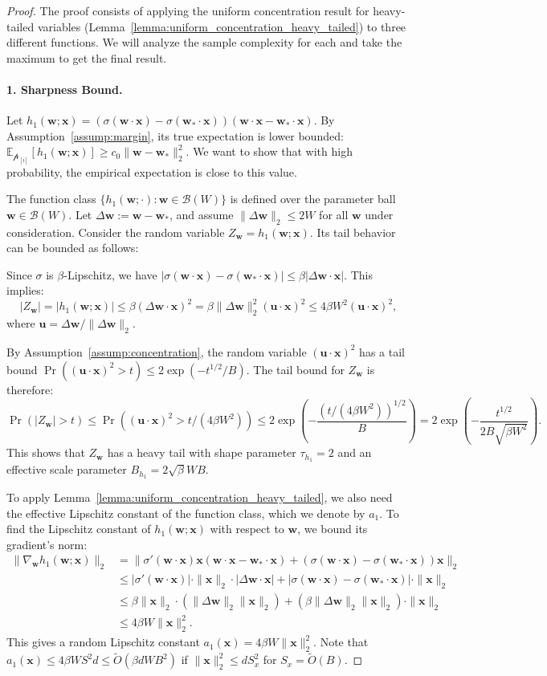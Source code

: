 \documentclass[11pt]{article}
\numberwithin{thm}{section}
\theoremstyle{plain}
\theoremstyle{definition}
\theoremstyle{remark} \newtheorem{remark}[thm]{Remark}
\def\vu{{\bm{u}}}
\def\vw{{\bm{w}}}
\def\vx{{\bm{x}}}
\def\pp{{\mathcal{p}}}
\def\cB{{\mathcal{B}}}
\newcommand{\E}{\mathbb{E}}
\newcommand{\ppi}{{\pp_{[i]}}}
\begin{document}
\begin{proof}
The proof consists of applying the uniform concentration result for heavy-tailed variables (Lemma~\ref{lemma:uniform_concentration_heavy_tailed}) to three different functions. We will analyze the sample complexity for each and take the maximum to get the final result. 

\paragraph{1. Sharpness Bound.}
Let $h_1(\vw;\vx) = (\sigma(\vw\cdot\vx)-\sigma(\vw_*\cdot\vx))(\vw\cdot\vx-\vw_*\cdot\vx)$. By Assumption~\ref{assump:margin}, its true expectation is lower bounded: $\E_{\ppi}[h_1(\vw;\vx)] \ge c_0\|\vw-\vw_*\|_2^2$. We want to show that with high probability, the empirical expectation is close to this value.

The function class $\{h_1(\vw;\cdot) : \vw \in \cB(W)\}$ is defined over the parameter ball $\vw \in \cB(W)$. Let $\Delta\vw := \vw-\vw_*$, and assume $\|\Delta\vw\|_2 \le 2W$ for all $\vw$ under consideration. 
Consider the random variable $Z_\vw = h_1(\vw;\vx)$. Its tail behavior can be bounded as follows:

Since $\sigma$ is $\beta$-Lipschitz, we have $|\sigma(\vw\cdot\vx)-\sigma(\vw_*\cdot\vx)| \le \beta|\Delta\vw\cdot\vx|$. This implies:
\[
|Z_\vw| = |h_1(\vw;\vx)| \le \beta(\Delta\vw\cdot\vx)^2 = \beta \|\Delta\vw\|_2^2 (\vu\cdot\vx)^2 \le 4\beta W^2 (\vu\cdot\vx)^2,
\]
where $\vu = \Delta\vw/\|\Delta\vw\|_2$.

By Assumption~\ref{assump:concentration}, the random variable $(\vu\cdot\vx)^2$ has a tail bound $\Pr((\vu\cdot\vx)^2 > t) \le 2\exp(-t^{1/2}/B)$. 
The tail bound for $Z_\vw$ is therefore:
\[
\Pr(|Z_\vw| > t) \le \Pr\left((\vu\cdot\vx)^2 > t/(4\beta W^2)\right)\le 2\exp\left(-\frac{(t/(4\beta W^2))^{1/2}}{B}\right) = 2\exp\left(-\frac{t^{1/2}}{2B \sqrt{\beta W^2}}\right).
\]
This shows that $Z_\vw$ has a heavy tail with shape parameter $\tau_{h_1} = 2$ and an effective scale parameter $B_{h_1} = 2\sqrt{\beta} W B$.

To apply Lemma~\ref{lemma:uniform_concentration_heavy_tailed}, we also need the effective Lipschitz constant of the function class, which we denote by $a_1$. 
To find the Lipschitz constant of $h_1(\vw;\vx)$ with respect to $\vw$, we bound its gradient's norm: \begin{align*}
    \|\nabla_\vw h_1(\vw;\vx)\|_2 &= \|\sigma'(\vw\cdot\vx)\vx(\vw\cdot\vx-\vw_*\cdot\vx) + (\sigma(\vw\cdot\vx)-\sigma(\vw_*\cdot\vx))\vx\|_2 \\
    &\le |\sigma'(\vw\cdot\vx)| \cdot \|\vx\|_2 \cdot |\Delta \vw\cdot\vx| + |\sigma(\vw\cdot\vx)-\sigma(\vw_*\cdot\vx)| \cdot \|\vx\|_2 \\
    &\le \beta \|\vx\|_2 \cdot (\|\Delta \vw\|_2 \|\vx\|_2) + (\beta \|\Delta \vw\|_2 \|\vx\|_2) \cdot \|\vx\|_2 \\
    & \le 4\beta W \|\vx\|_2^2.
\end{align*}
This gives a random Lipschitz constant $a_1(\vx) = 4\beta W \|\vx\|_2^2$. 
Note that $a_1(\vx) \leq 4\beta W S^2 d \le \tilde{O}(\beta d W B^2)$ if $\|\vx\|_2^2 \le d S_x^2$ for $S_x = \tilde{O}(B)$. 



\end{proof}
\end{document}
